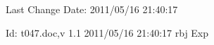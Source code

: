 Last Change $ $Date: 2011/05/16 21:40:17 $ $

$ $Id: t047.doc,v 1.1 2011/05/16 21:40:17 rbj Exp $ $
